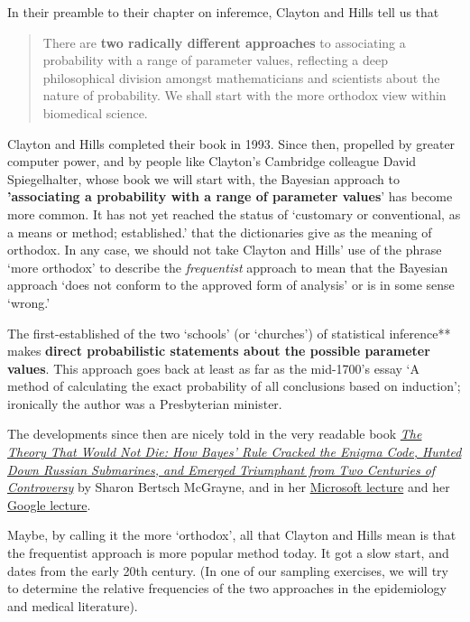 \documentclass[]{book}
\begin{document}
In their preamble to their chapter on inferemce, Clayton and Hills tell us that

\begin{quote}
There are \textbf{two radically different approaches} to associating a probability with a range of parameter values, reflecting a deep philosophical division amongst mathematicians and scientists about the nature of probability. We shall start with the more orthodox view within biomedical science.
\end{quote}

Clayton and Hills completed their book in 1993.
Since then, propelled by greater computer power, and by people like
Clayton's Cambridge colleague David Spiegelhalter, whose book we will start with, the Bayesian approach to \textbf{'associating a probability with a range of parameter values}' has become more common. It has not yet reached the status of `customary or conventional, as a means or method; established.' that the dictionaries give as the meaning of orthodox. In any case, we should not take Clayton and Hills' use of the phrase `more orthodox' to describe the \emph{frequentist} approach to mean
that the Bayesian approach `does not conform to the approved form of analysis' or is in some sense `wrong.'

The first-established of the two `schools' (or `churches') of statistical inference** makes \textbf{direct probabilistic statements about the possible parameter values}. This approach goes back at least as far as the mid-1700's essay `A method of calculating the exact probability of all conclusions based on induction'; ironically the author was a Presbyterian minister.

The developments since then are nicely told in the very readable book \href{https://www.amazon.com/Theory-That-Would-Not-Die-ebook/dp/B0050QB3EQ}{\emph{The Theory That Would Not Die: How Bayes' Rule Cracked the Enigma Code, Hunted Down Russian Submarines, and Emerged Triumphant from Two Centuries of Controversy}} by Sharon Bertsch McGrayne, and in her \href{https://www.youtube.com/embed/2o-_BGqYM5U}{Microsoft lecture}
and her \href{https://www.youtube.com/embed/8oD6eBkjF9o}{Google lecture}.

Maybe, by calling it the more `orthodox', all that Clayton and Hills mean is that the frequentist approach is more popular method today. It got a slow start, and dates from the early 20th century. (In one of our sampling exercises, we will try to determine the relative frequencies of the two approaches in the epidemiology and medical literature).
\end{document}
